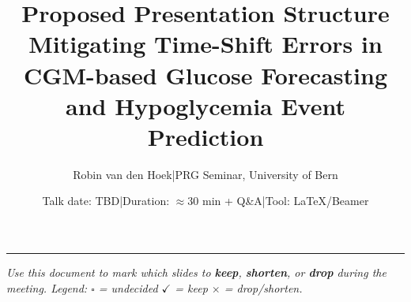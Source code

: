 \documentclass[a4paper,10pt]{article}
\title{\textbf{Proposed Presentation Structure}\\[0.2em]
{\normalsize Mitigating Time-Shift Errors in CGM-based Glucose Forecasting\\
and Hypoglycemia Event Prediction}}
\author{Robin van den Hoek\quad|\quad PRG Seminar, University of Bern}
\date{Talk date: TBD\quad|\quad Duration: $\approx$30 min + Q\&A\quad|\quad Tool: \LaTeX/Beamer}
\begin{document}
\maketitle
\vspace{-1em}
\hrule
\vspace{0.5em}

{\small\textit{Use this document to mark which slides to \textbf{keep}, \textbf{shorten}, or \textbf{drop} during the meeting. Legend: $\square$ = undecided \quad $\checkmark$ = keep \quad $\times$ = drop/shorten.}}

\vspace{0.6em}

\end{document}
